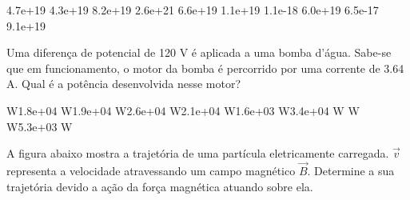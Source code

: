 \documentclass[12pt, addpoints]{exam}
\begin{document}
\begin{questions}
\begin{multicols*}{2}
\begin{oneparchoices}
\choice 4.7e+19 \choice 4.3e+19 \choice 8.2e+19 \choice 2.6e+21 \choice 6.6e+19 \choice 1.1e+19 \choice 1.1e-18 \choice 6.0e+19 \choice 6.5e-17 \choice 9.1e+19 
\end{oneparchoices}\question Uma diferença de potencial de 120 V é aplicada a uma bomba d’água. Sabe-se que em funcionamento, o motor da bomba é percorrido por uma corrente de    3.64 A. Qual é a potência desenvolvida nesse motor?

\begin{oneparchoices}
 W\choice 1.8e+04 W\choice 1.9e+04 W\choice 2.6e+04 W\choice 2.1e+04 W\choice 1.6e+03 W\choice 3.4e+04 W W W\choice 5.3e+03 W
\end{oneparchoices}\question A ﬁgura abaixo mostra a trajetória de uma partícula eletricamente carregada. $\vec{{v}}$ representa a velocidade atravessando um campo magnético $\vec{{B}}$. Determine a sua trajetória devido a ação da força magnética atuando sobre ela.
        
        \begin{center}
            \begin{minipage}[c]{0.5\linewidth}
            \end{minipage}
        \end{center}

        


\end{multicols*}
\end{questions}
\end{document}
